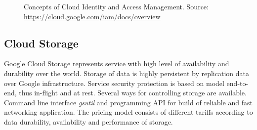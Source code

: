 \documentclass[a4paper,12pt,oneside]{report}
\begin{document}
	\begin{figure}[!htbp]
		\centering
		
		
		\caption[Cloud Identity and Access]{Concepts of Cloud Identity and Access Management. Source: \url{https://cloud.google.com/iam/docs/overview} 
			\centering }
		\label{fig:iam}
	\end{figure}
	
	
	\subsection{Cloud Storage}
	\label{subsub:datastore}
	Google Cloud Storage represents service  with high level of availability and durability 
	over the world. Storage of data is highly persistent by replication data over
	Google 
	infrastructure. Service security protection is based 
	on model end-to-end, thus in-flight and at rest.  Several ways for controlling
	storage are available. Command 
	line interface \textit{gsutil} and programming API for build of 
	reliable and fast networking application. The pricing model consists of different
	tariffs 
	according to data durability, availability and performance of storage.
	
\end{document}
